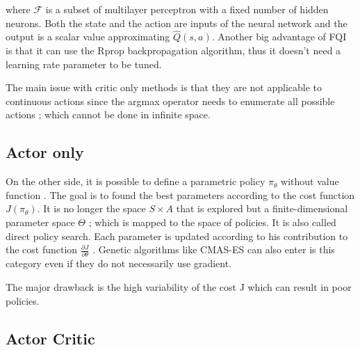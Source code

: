 
where $\mathcal{F}$ is a subset of multilayer perceptron with a fixed number of hidden neurons.
Both the state and the action are inputs of the neural network and the output is a scalar value
approximating $\hat{Q}(s,a)$. Another big advantage of FQI is that it can use
the Rprop \cite{Igel2000} backpropagation algorithm, thus it doesn't need a learning rate parameter
to be tuned.

The main issue with critic only methods is that they are not applicable to continuous actions since
the argmax operator needs to enumerate all possible actions ; which cannot be done in infinite space.

\subsection{Actor only}

On the other side, it is possible to define a parametric policy $\pi_{\theta}$ without value function \cite{Sutton1999}.
The goal is to found the best parameters according to the cost function $J(\pi_{\theta})$. 
It is no longer the space $S \times A$ that is explored but a finite-dimensional parameter space $\Theta$ ;
which is mapped to the space of policies. It is also called direct policy search.
Each parameter is updated according to his contribution to the cost function 
$ \frac{\partial J}{\partial \theta} $ \cite{Kober2010a}.
Genetic algorithms like CMAS-ES \cite{Hansen2001} can also enter is this category even if 
they do not necessarily use gradient.

The major drawback is the high variability of the cost J which can result in poor policies.

\subsection{Actor Critic}

